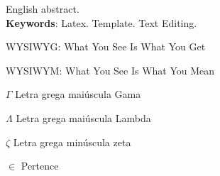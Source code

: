 \documentclass[
	12pt,    %
	oneside, %
	a4paper, %
	chapter=TITLE, %
	section=TITLE, %
	sumario=tradicional, %
	english, %
	brazil   %
] {abntex2}
\begin{document}
	\begin{resumo}[Abstract]
		English abstract.
		\vspace{\onelineskip}
		\noindent \\
		\textbf{Keywords}: Latex. Template. Text Editing.	
	\end{resumo}
	
	\renewcommand\listfigurename{LISTA DE FIGURAS}	
	\listoffigures
	\cleardoublepage
	
	\listofquadros
	\cleardoublepage	
	
	\renewcommand\listtablename{LISTA DE TABELAS}	
	\listoftables
	\cleardoublepage

	\begin{siglas}
		\item[WYSIWYG:] What You See Is What You Get
		\item[WYSIWYM:] What You See Is What You Mean		
	\end{siglas}
	
	\begin{simbolos}
		\item[$ \Gamma $] Letra grega maiúscula Gama
		\item[$ \Lambda $] Letra grega maiúscula Lambda		
		\item[$ \zeta$] Letra grega minúscula zeta
		\item[$ \in $] Pertence
	\end{simbolos}	

	\tableofcontents*
	\cleardoublepage	
	
	\textual	
\end{document}
